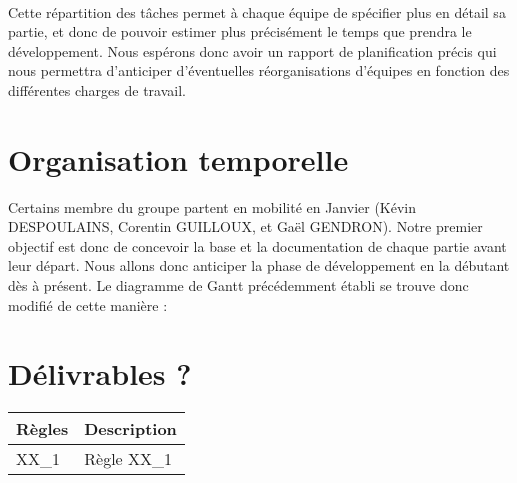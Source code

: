 \paragraph{}
Cette répartition des tâches permet à chaque équipe de spécifier plus en détail
sa partie, et donc de pouvoir estimer plus précisément le temps que prendra le
développement. Nous espérons donc avoir un rapport de planification précis qui
nous permettra d’anticiper d’éventuelles réorganisations d’équipes en fonction
des différentes charges de travail.

\section{Organisation temporelle}

Certains membre du groupe partent en mobilité en Janvier (Kévin DESPOULAINS,
Corentin GUILLOUX, et Gaël GENDRON). Notre premier objectif est donc de
concevoir la base et la documentation de chaque partie avant leur départ.
Nous allons donc anticiper la phase de développement en la débutant dès à
présent. Le diagramme de Gantt précédemment établi se trouve donc modifié de
cette manière :

\paragraph{}
\begin{mdframed}[frametitle={Gantt + légende}, innerbottommargin=10]
\begin{center}
\end{center}
\end{mdframed}

\section{Délivrables ?}

\begin{mdframed}[frametitle={Figure N : LOT 1 - X}, innerbottommargin=10]
\begin{center}
\begin{tabular}{ | l | l | }
\hline
{\textbf{Règles}}   &   {\textbf{Description}} \\ \hline
{XX\_1}              &   {Règle XX\_1} \\ \hline
\end{tabular}
\end{center}
\end{mdframed}

